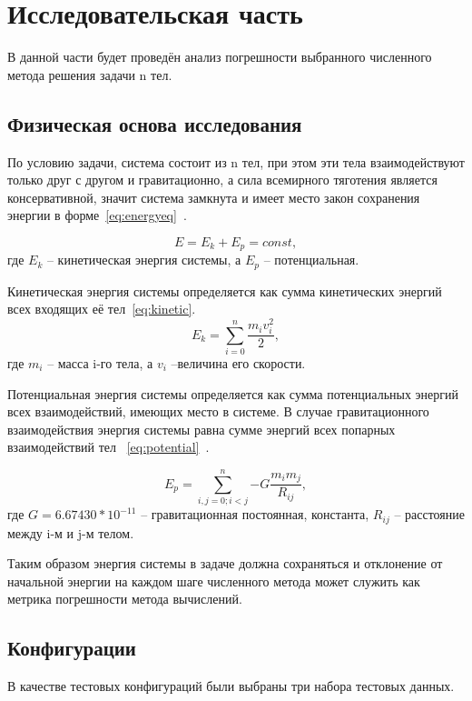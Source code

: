 \chapter{Исследовательская часть}

В данной части будет проведён анализ погрешности выбранного численного метода решения задачи n тел.

\section{Физическая основа исследования}

По условию задачи, система состоит из n тел, при этом эти тела взаимодействуют только друг с другом и гравитационно, а сила всемирного тяготения является консервативной, значит система замкнута и имеет место закон сохранения энергии в форме~\ref{eq:energyeq}~\cite{fn4}.

\begin{equation}
	\label{eq:energyeq}
	E = E_k + E_p = const,
\end{equation}
где $E_k$ -- кинетическая энергия системы, а $E_p$ -- потенциальная.

Кинетическая энергия системы определяется как сумма кинетических энергий всех входящих её тел~\ref{eq:kinetic}.
\begin{equation}
	\label{eq:kinetic}
	E_k = \sum_{i=0}^n{\frac{m_iv_i^2}{2}},
\end{equation}
где $m_i$ -- масса i-го тела, а $v_i$ --величина его скорости.

Потенциальная энергия системы определяется как сумма потенциальных энергий всех взаимодействий, имеющих место в системе. В случае гравитационного взаимодействия энергия системы равна сумме энергий всех попарных взаимодействий тел ~\ref{eq:potential}~\cite{fn4}.


\begin{equation}
	\label{eq:potential}
	E_p = \sum_{i,j=0; i < j}^n{-G\frac{m_im_j}{R_{ij}}},
\end{equation}
где $G = 6.67430 * 10^{-11}$ -- гравитационная постоянная, константа, $R_{ij}$ -- расстояние между i-м и j-м телом.

Таким образом энергия системы в задаче должна сохраняться и отклонение от начальной энергии на каждом шаге численного метода может служить как метрика погрешности метода вычислений.

\section{Конфигурации}
В качестве тестовых конфигураций были выбраны три набора тестовых данных.

